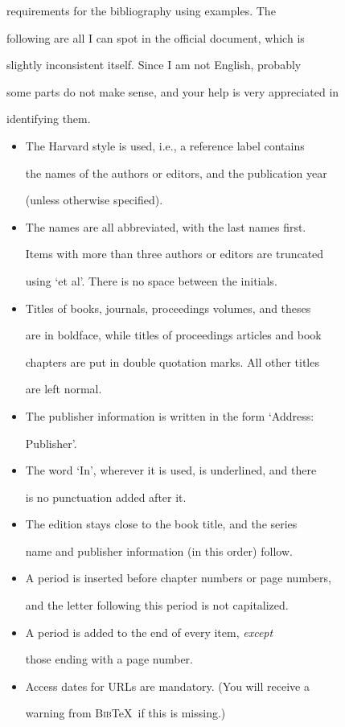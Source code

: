 \documentclass{bhamthesis}
\providecommand{\BibTeX}{\textsc{Bib}\TeX}
\begin{document}
requirements for the bibliography using examples.  The

following are all I can spot in the official document, which is

slightly inconsistent itself.  Since I am not English, probably

some parts do not make sense, and your help is very appreciated in

identifying them.

\begin{itemize}

\item The Harvard style is used, i.e., a reference label contains

  the names of the authors or editors, and the publication year

  (unless otherwise specified).

\item The names are all abbreviated, with the last names first.

  Items with more than three authors or editors are truncated

  using `et al'.  There is no space between the initials.

\item Titles of books, journals, proceedings volumes, and theses

  are in boldface, while titles of proceedings articles and book

  chapters are put in double quotation marks.  All other titles

  are left normal.

\item The publisher information is written in the form `Address:

  Publisher'.

\item The word `In', wherever it is used, is underlined, and there

  is no punctuation added after it.

\item The edition stays close to the book title, and the series

  name and publisher information (in this order) follow.

\item A period is inserted before chapter numbers or page numbers,

  and the letter following this period is not capitalized.

\item A period is added to the end of every item, \emph{except}

  those ending with a page number.

\item Access dates for URLs are mandatory.  (You will receive a

  warning from \BibTeX\ if this is missing.)

\end{itemize}
\end{document}
